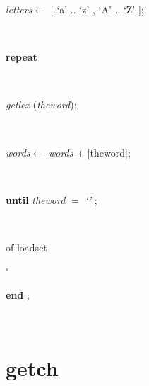 \documentclass[10pt, a4paper]{article}
\begin{document}
\begin{tabbing}
\parbox{14cm}{\textsf{\textit{letters}$\leftarrow$ \textit{}[\textrm{\textup { `a' } }..\textrm{\textup { `z' } }, \textrm{\textup { `A' } }..\textrm{\textup { `Z' } }]}; }\\
\+\parbox{14cm}{\textsf{\textbf{repeat} }}\\
\parbox{14cm}{\textsf{\textit{getlex} (\textit{theword})}; }\\
\parbox{14cm}{\textsf{\textit{words}$\leftarrow$ \textit{words} + \textit{}[theword]}; }\\
\-\<\parbox{14cm}{\textsf {\textbf {until } \textsf{\textit{theword} $=$ \textit{\textrm{\textup { `' } }}}; }}\\
\<\-\parbox{3.5cm}{\scriptsize{of loadset}}\'\parbox{14cm}{\textsf{\textbf{end}  ;}}\\
\end{tabbing}
\section{getch}\label{sec:./uniquewords/loadsetgetch}
\end{document}
